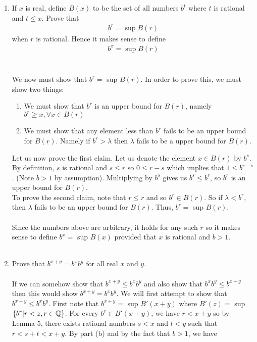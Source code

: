 \documentclass[12pt]{article}
\begin{document}
\begin{enumerate}
\item If $x$ is real, define $B(x)$ to be the set of all numbers $b^{t}$ where $t$ is rational and $t \leq x$. Prove that \begin{align*}
b^{r} = \; \text{sup} \; B(r)
\end{align*}
when $r$ is rational. Hence it makes sense to define 
\begin{align*}
b^{x}= \; \text{sup} \; B(r)
\end{align*}  \\ \\
We now must show that $ b^{r} =$ sup $B(r)$. In order to prove this, we must show two things: \\
\begin{enumerate}
\item We must show that $b^{r}$ is an upper bound  for $B(r)$, namely $b^{r} \geq x , \forall x \in B(r)$ 
\item We must show that any element less than $b^{r}$ fails to be an upper bound for $B(r)$. Namely if $b^{r} > \lambda$ then $\lambda$ fails to be a upper bound for $B(r)$.
\end{enumerate} 
Let us now prove the first claim. Let us denote the element $x \in B(r)$ by $b^{s}$. By definition, $s$ is rational and $ s \leq r$ so $0 \leq r-s$ which implies that $1 \leq b^{r-s}$. (Note $b>1$ by assumption). Multiplying by $b^{s}$ gives us $b^{s} \leq b^{r}$, so $b^{r}$ is an upper bound for $B(r)$. \\ 
To prove the second claim, note that $r \leq r$ and so $b^{r} \in B(r)$. So if $\lambda
< b^{r}$, then $\lambda$ fails to be an upper bound for $B(r)$. Thus, $ b^{r} =$ sup $B(r)$. \\ \\  
Since the numbers above are arbitrary, it holds for any such $r$ so it makes sense to define  $ b^{x} =$ sup $B(x)$ provided that $x$ is rational and $b>1$. \\ \\
\item Prove that $b^{x+y}=b^{x}b^{y}$ for all real $x$ and $y$. \\ \\
If we can somehow show that $b^{x+y} \leq b^{x}b^{y}$ and also show that $ b^{x}b^{y} \leq b^{x+y}$ then this would show $b^{x+y} = b^{x}b^{y}$. We will first attempt to show that $b^{x+y} \leq b^{x}b^{y}$. First note that $b^{x+y} =$ sup $B'(x+y)$ where $B'(z)=$ sup $\left\{b^{r} | r < z, r \in \mathbb{Q}\right\}$. For every $b^{r} \in B'(x+y)$, we have $r<x+y$ so by Lemma 5, there exists rational numbers $s<x$ and $t<y$ such that $r<s+t<x+y$. By part (b) and by the fact that $b>1$, we have

\end{enumerate}
\end{document}
